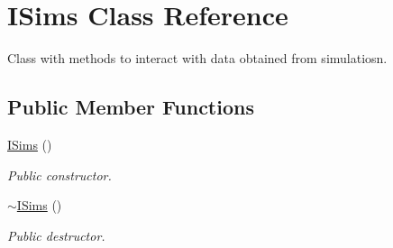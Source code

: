 \hypertarget{classISims}{}\section{I\+Sims Class Reference}
\label{classISims}


Class with methods to interact with data obtained from simulatiosn.  


\subsection*{Public Member Functions}
\begin{DoxyCompactItemize}
\item 
\mbox{\label{classISims_ac9f3934037a00911e2482ffc694539b4}} 
\hyperlink{classISims_ac9f3934037a00911e2482ffc694539b4}{I\+Sims} ()
\begin{DoxyCompactList}\small\item\em Public constructor. \end{DoxyCompactList}\item 
\mbox{\label{classISims_aee093f68f99f2e8e3290a80eedb0f566}} 
\hyperlink{classISims_aee093f68f99f2e8e3290a80eedb0f566}{$\sim$\+I\+Sims} ()
\begin{DoxyCompactList}\small\item\em Public destructor. \end{DoxyCompactList}\end{DoxyCompactItemize}
